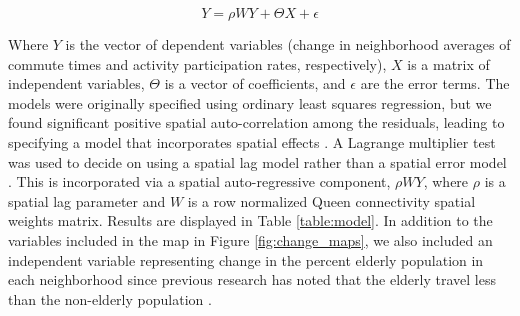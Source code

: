 \begin{equation}
Y = \rho W Y + \Theta X + \epsilon
\end{equation}

Where $Y$ is the vector of dependent variables (change in neighborhood averages of commute times and activity participation rates, respectively), $X$ is a matrix of independent variables, $\Theta$ is a vector of coefficients, and $\epsilon$ are the error terms. The models were originally specified using ordinary least squares regression, but we found significant positive spatial auto-correlation among the residuals, leading to specifying a model that incorporates spatial effects \cite{anselin_spatial_1988}. A Lagrange multiplier test was used to decide on using a spatial lag model rather than a spatial error model \cite{anselin_exploring_2005}. This is incorporated via a spatial auto-regressive component, $\rho W Y$, where $\rho$ is a spatial lag parameter and $W$ is a row normalized Queen connectivity spatial weights matrix. Results are displayed in Table \ref{table:model}. In addition to the variables included in the map in Figure \ref{fig:change_maps}, we also included an independent variable representing change in the percent elderly population in each neighborhood since previous research has noted that the elderly travel less than the non-elderly population .


